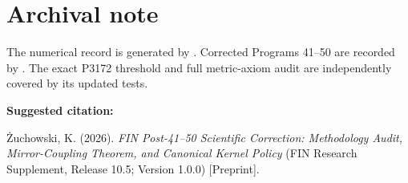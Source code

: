 \documentclass[11pt,a4paper,openany]{report}
\begin{document}
\clearpage
\chapter*{Archival note}
The numerical record  is generated
by . Corrected Programs 41--50 are
recorded by . The exact P3172 threshold
and full metric-axiom audit are independently covered by its updated tests.

\medskip
\noindent\textbf{Suggested citation:}

\.Zuchowski, K. (2026). \emph{FIN Post-41--50 Scientific Correction:
Methodology Audit, Mirror-Coupling Theorem, and Canonical Kernel Policy}
(FIN Research Supplement, Release 10.5; Version 1.0.0) [Preprint].
\end{document}
